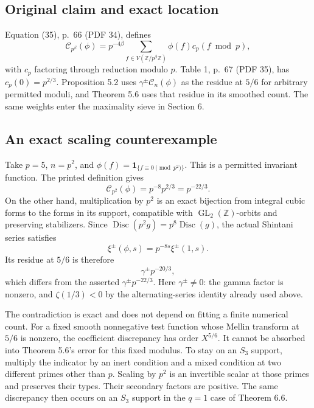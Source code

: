 \documentclass[10pt]{article}
\begin{document}
\subsection*{Original claim and exact location}
Equation (35), p. 66 (PDF 34), defines \[\mathcal C_{p^\beta}(\phi)
   =p^{-4\beta}\sum_{f\in V(\mathbb Z/p^\beta\mathbb Z)}
      \phi(f)c_p(f\bmod p),\] with \(c_p\) factoring through reduction modulo \(p\). Table 1, p. 67 (PDF 35), has \(c_p(0)=p^{2/3}\). Proposition 5.2 uses \(\gamma^\pm\mathcal C_n(\phi)\) as the residue at \(5/6\) for arbitrary permitted moduli, and Theorem 5.6 uses that residue in its smoothed count. The same weights enter the maximality sieve in Section 6.\par
\subsection*{An exact scaling counterexample}
Take \(p=5\), \(n=p^2\), and \(\phi(f)=\mathbf1_{\{f\equiv0\pmod{p^2}\}}\). This is a permitted invariant function. The printed definition gives \[\mathcal C_{p^2}(\phi)=p^{-8}p^{2/3}=p^{-22/3}.\] On the other hand, multiplication by \(p^2\) is an exact bijection from integral cubic forms to the forms in its support, compatible with \(\operatorname{GL}_2(\mathbb Z)\)-orbits and preserving stabilizers. Since \(\operatorname{Disc}(p^2g)=p^8\operatorname{Disc}(g)\), the actual Shintani series satisfies \[\xi^\pm(\phi,s)=p^{-8s}\xi^\pm(1,s).\] Its residue at \(5/6\) is therefore \[\gamma^\pm p^{-20/3},\] which differs from the asserted \(\gamma^\pm p^{-22/3}\). Here \(\gamma^\pm\ne0\): the gamma factor is nonzero, and \(\zeta(1/3)<0\) by the alternating-series identity already used above.\par
The contradiction is exact and does not depend on fitting a finite numerical count. For a fixed smooth nonnegative test function whose Mellin transform at \(5/6\) is nonzero, the coefficient discrepancy has order \(X^{5/6}\). It cannot be absorbed into Theorem 5.6’s error for this fixed modulus. To stay on an \(S_3\) support, multiply the indicator by an inert condition and a mixed condition at two different primes other than \(p\). Scaling by \(p^2\) is an invertible scalar at those primes and preserves their types. Their secondary factors are positive. The same discrepancy then occurs on an \(S_3\) support in the \(q=1\) case of Theorem 6.6.\par
\end{document}
